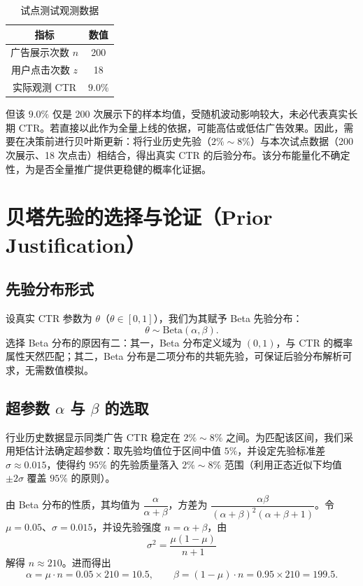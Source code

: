 \documentclass[12pt,a4paper,UTF8,fontset=none]{ctexart}
\newcommand{\thead}[1]{\sffamily\bfseries\color{navy}#1}
\newcommand{\tht}{\theta}
\begin{document}
\begin{table}[H]
\centering
\caption{试点测试观测数据}
\label{tab:data}
\begin{tabular}{cc}
\toprule
\thead{指标} & \thead{数值} \\
\midrule
广告展示次数 $n$ & 200 \\
\rowcolor{softbg} 用户点击次数 $z$ & 18 \\
实际观测 CTR & $9.0\%$ \\
\bottomrule
\end{tabular}
\end{table}

但该 $9.0\%$ 仅是 200 次展示下的样本均值，受随机波动影响较大，未必代表真实长期 CTR。若直接以此作为全量上线的依据，可能高估或低估广告效果。因此，需要在决策前进行贝叶斯更新：将行业历史先验（$2\%\sim8\%$）与本次试点数据（200 次展示、18 次点击）相结合，得出真实 CTR 的后验分布。该分布能量化不确定性，为是否全量推广提供更稳健的概率化证据。

\section{贝塔先验的选择与论证（Prior Justification）}

\subsection{先验分布形式}

设真实 CTR 参数为 $\tht$（$\tht\in[0,1]$），我们为其赋予 Beta 先验分布：
\[
  \tht \sim \mathrm{Beta}(\alpha,\beta).
\]
选择 Beta 分布的原因有二：其一，Beta 分布定义域为 $(0,1)$，与 CTR 的概率属性天然匹配；其二，Beta 分布是二项分布的共轭先验，可保证后验分布解析可求，无需数值模拟。

\subsection{超参数 $\alpha$ 与 $\beta$ 的选取}

行业历史数据显示同类广告 CTR 稳定在 $2\%\sim8\%$ 之间。为匹配该区间，我们采用矩估计法确定超参数：取先验均值位于区间中值 $5\%$，并设定先验标准差 $\sigma\approx0.015$，使得约 $95\%$ 的先验质量落入 $2\%\sim8\%$ 范围（利用正态近似下均值 $\pm2\sigma$ 覆盖 $95\%$ 的原则）。

由 Beta 分布的性质，其均值为 $\dfrac{\alpha}{\alpha+\beta}$，方差为 $\dfrac{\alpha\beta}{(\alpha+\beta)^2(\alpha+\beta+1)}$。令 $\mu=0.05$、$\sigma=0.015$，并设先验强度 $n=\alpha+\beta$，由
\[
  \sigma^{2}=\frac{\mu(1-\mu)}{n+1}
\]
解得 $n\approx210$。进而得出
\[
  \alpha=\mu\cdot n=0.05\times210=10.5,\qquad
  \beta=(1-\mu)\cdot n=0.95\times210=199.5 .
\]
\end{document}
